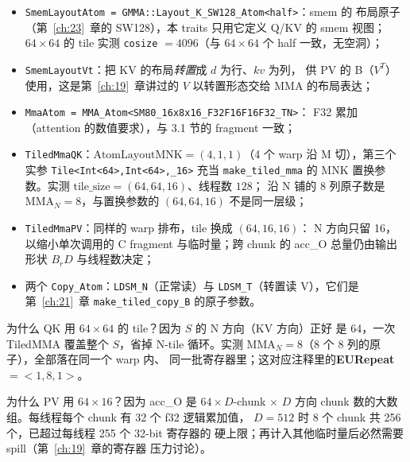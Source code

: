 \begin{itemize}
  \item \texttt{Smem\allowbreak{}Layout\allowbreak{}Atom =\allowbreak{} GMMA::\allowbreak{}Layout\_\allowbreak{}K\_\allowbreak{}SW128\_\allowbreak{}Atom\allowbreak{}<half>}：smem 的
        布局原子（第~\ref{ch:23}~章的 SW128），本 traits 只用它定义
        Q/KV 的 smem 视图；$64\times64$ 的 tile 实测
        \texttt{cosize} $=4096$（与 $64\times64$ 个 half 一致，无空洞）；
  \item \texttt{Smem\allowbreak{}Layout\allowbreak{}Vt}：把 KV 的布局\emph{转置}成 $d$ 为行、$kv$ 为列，
        供 PV 的 B（$V^T$）使用，这是第~\ref{ch:19}~章讲过的 $V$ 以转置形态交给
        MMA 的布局表达；
  \item \texttt{Mma\allowbreak{}Atom =\allowbreak{} MMA\_\allowbreak{}Atom\allowbreak{}<SM80\_\allowbreak{}16x8x16\_\allowbreak{}F32\allowbreak{}F16\allowbreak{}F16\allowbreak{}F32\_\allowbreak{}TN>}：
        F32 累加（attention 的数值要求），与 3.1 节的 fragment 一致；
  \item \texttt{TiledMmaQK}：$\mathrm{AtomLayoutMNK} = (4,1,1)$（4 个 warp
        沿 M 切），第三个实参
        \texttt{Tile<Int<64>,Int<64>,\_16>} 充当 \texttt{make\_tiled\_mma} 的
        MNK 置换参数。实测 $\mathrm{tile\_size} = (64,64,16)$、线程数 $128$；
        沿 N 铺的 $8$ 列原子数是 $\mathrm{MMA}_N = 8$，与置换参数的
        $(64,64,16)$ 不是同一层级；
  \item \texttt{TiledMmaPV}：同样的 warp 排布，tile 换成 $(64,16,16)$：
        N 方向只留 16，以缩小单次调用的 C fragment 与临时量；跨 chunk 的
        acc\_O 总量仍由输出形状 $B_rD$ 与线程数决定；
  \item 两个 \texttt{Copy\_Atom}：\texttt{LDSM\_N}（正常读）与
        \texttt{LDSM\_T}（转置读 V），它们是第~\ref{ch:21}~章
        \texttt{make\_\allowbreak{}tiled\_\allowbreak{}copy\_\allowbreak{}B} 的原子参数。
\end{itemize}

为什么 QK 用 $64\times64$ 的 tile？因为 $S$ 的 N 方向（KV 方向）正好
是 64，一次 TiledMMA 覆盖整个 $S$，省掉 N-tile 循环。实测
$\mathrm{MMA}_N = 8$（$8$ 个 $8$ 列的原子），全部落在同一个 warp 内、
同一批寄存器里；这对应注释里的\textbf{EURepeat$=<1,8,1>$}。

为什么 PV 用 $64\times16$？因为 acc\_O 是 $64\times D$-chunk $\times$
$D$ 方向 chunk 数的大数组。每线程每个 chunk 有 32 个 f32 逻辑累加值，
$D=512$ 时 $8$ 个 chunk 共 256 个，已超过每线程 255 个 32-bit 寄存器的
硬上限；再计入其他临时量后必然需要 spill（第~\ref{ch:19}~章的寄存器
压力讨论）。

